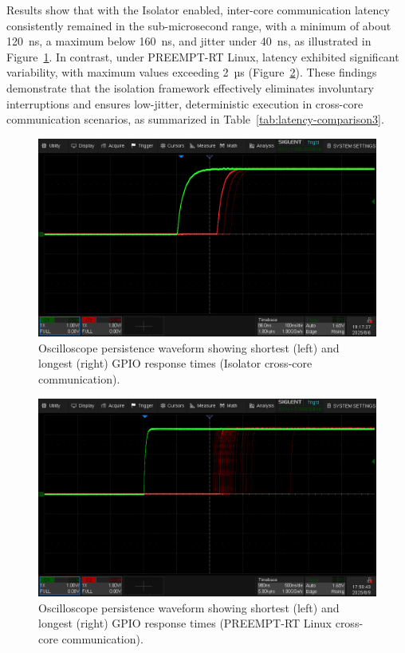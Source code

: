 \documentclass[letterpaper]{article}
\begin{document}
Results show that with the Isolator enabled, inter-core communication latency consistently remained
in the sub-microsecond range, with a minimum of about 120~ns, a maximum below 160~ns, and jitter
under 40~ns, as illustrated in Figure~\ref{fig:islcrossgpio}. In contrast, under PREEMPT-RT Linux,
latency exhibited significant variability, with maximum values exceeding 2~µs
(Figure~\ref{fig:linuxcrossgpio}). These findings demonstrate that the isolation framework effectively
eliminates involuntary interruptions and ensures low-jitter, deterministic execution in cross-core
communication scenarios, as summarized in Table~\ref{tab:latency-comparison3}.

\begin{figure}[H]
  \centering
  \includegraphics[width=0.8\linewidth]{figures/islcrosscoreintgpio.png}
  \caption{Oscilloscope persistence waveform showing shortest (left) and longest (right) GPIO response times (Isolator cross-core communication).}
  \label{fig:islcrossgpio}
\end{figure}

\begin{figure}[H]
  \centering
  \includegraphics[width=0.8\linewidth]{figures/linuxcrosscoreintgpio.png}
  \caption{Oscilloscope persistence waveform showing shortest (left) and longest (right) GPIO response times (PREEMPT-RT Linux cross-core communication).}
  \label{fig:linuxcrossgpio}
\end{figure}
\end{document}
